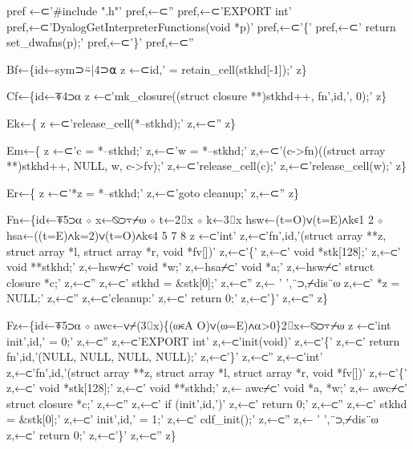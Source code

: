 \documentclass{article}%
\begin{document}
        pref ←⊂'#include ".h"'
        pref,←⊂''
        pref,←⊂'EXPORT int'
        pref,←⊂'DyalogGetInterpreterFunctions(void *p)'
        pref,←⊂'\{'
        pref,←⊂'    return set_dwafns(p);'
        pref,←⊂'\}'
        pref,←⊂''

        Bf←\{id←sym⊃⍨|4⊃⍺
                z ←⊂id,' = retain_cell(stkhd[-1]);'
        z\}

        Cf←\{id←⍕4⊃⍺
                z ←⊂'mk_closure((struct closure **)stkhd++, fn',id,', 0);'
        z\}

        Ek←\{
                z ←⊂'release_cell(*--stkhd);'
                z,←⊂''
        z\}

        Em←\{
                z ←⊂'c = *--stkhd;'
                z,←⊂'w = *--stkhd;'
                z,←⊂'(c->fn)((struct array **)stkhd++, NULL, w, c->fv);'
                z,←⊂'release_cell(c);'
                z,←⊂'release_cell(w);'
        z\}

        Er←\{
                z ←⊂'*z = *--stkhd;'
                z,←⊂'goto cleanup;'
                z,←⊂''
        z\}

        Fn←\{id←⍕5⊃⍺ ⋄ x←⍉⊃⍪⌿⍵ ⋄ t←2⌷x ⋄ k←3⌷x
                hsw←(t=O)∨(t=E)∧k∊1 2 ⋄ hsa←((t=E)∧k=2)∨(t=O)∧k∊4 5 7 8
                z ←⊂'int'
                z,←⊂'fn',id,'(struct array **z, struct array *l, struct array *r, void *fv[])'
                z,←⊂'\{'
                z,←⊂'       void    *stk[128];'
                z,←⊂'       void    **stkhd;'
                z,←hsw⌿⊂' void    *w;'
                z,←hsa⌿⊂' void    *a;'
                z,←hsw⌿⊂' struct  closure *c;'
                z,←⊂''
                z,←⊂'       stkhd = &stk[0];'
                z,←⊂''
                z,← ' ',¨⊃,⌿dis¨⍵
                z,←⊂'       *z = NULL;'
                z,←⊂''
                z,←⊂'cleanup:'
                z,←⊂'       return 0;'
                z,←⊂'\}'
                z,←⊂''
        z\}

        Fz←\{id←⍕5⊃⍺ ⋄ awc←∨⌿(3⌷x)\{(⍵∊A O)∨(⍵=E)∧⍺>0\}2⌷x←⍉⊃⍪⌿⍵
                z ←⊂'int init',id,' = 0;'
                z,←⊂''
                z,←⊂'EXPORT int'
                z,←⊂'init(void)'
                z,←⊂'\{'
                z,←⊂' return fn',id,'(NULL, NULL, NULL, NULL);'
                z,←⊂'\}'
                z,←⊂''
                z,←⊂'int'
                z,←⊂'fn',id,'(struct array **z, struct array *l, struct array *r, void *fv[])'
                z,←⊂'\{'
                z,←⊂'       void    *stk[128];'
                z,←⊂'       void    **stkhd;'
                z,← awc⌿⊂'        void    *a, *w;'
                z,← awc⌿⊂'        struct  closure *c;'
                z,←⊂''
                z,←⊂'       if (init',id,')'
                z,←⊂'               return 0;'
                z,←⊂''
                z,←⊂'       stkhd = &stk[0];'
                z,←⊂'       init',id,' = 1;'
                z,←⊂'       cdf_init();'
                z,←⊂''
                z,← ' ',¨⊃,⌿dis¨⍵
                z,←⊂'       return 0;'
                z,←⊂'\}'
                z,←⊂''
        z\}
\end{document}

